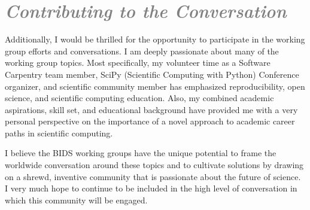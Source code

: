 \documentclass[a4paper, 10pt]{article}
\begin{document}
\section*{\textcolor{gray}{\it Contributing to the Conversation}}

Additionally, I would be thrilled for the opportunity to participate in the 
working group efforts and conversations. I am deeply passionate about many of 
the working group topics. Most specifically, my volunteer time as a Software 
Carpentry team member, SciPy (Scientific Computing with Python) Conference 
organizer, and scientific community member has emphasized reproducibility, open 
science, and scientific computing education. Also, my combined academic 
aspirations, skill set, and educational background have provided me with a very 
personal perspective on the importance of a novel approach to academic career 
paths in scientific computing.

I believe the BIDS working groups have the unique potential to frame the 
worldwide conversation around these topics and to cultivate solutions by drawing 
on a shrewd, inventive community that is passionate about the future of science.  
I very much hope to continue to be included in the high level of conversation in 
which this community will be engaged.



\end{document}
